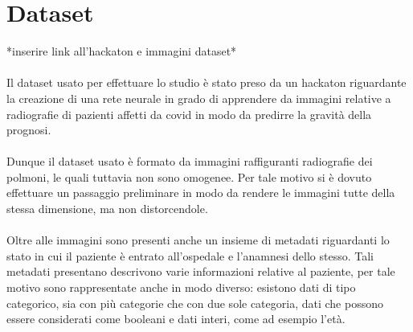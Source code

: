 \chapter{Dataset}
\label{ch:Dataset}

*inserire link all'hackaton e immagini dataset*
\\\\
Il dataset usato per effettuare lo studio è stato preso da un hackaton riguardante la creazione di una rete neurale in grado di apprendere 
da immagini relative a radiografie di pazienti affetti da covid in modo da predirre la gravità della prognosi.
\\\\
Dunque il dataset usato è formato da immagini raffiguranti radiografie dei polmoni, le quali tuttavia non sono omogenee. Per tale motivo 
si è dovuto effettuare un passaggio preliminare in modo da rendere le immagini tutte della stessa dimensione, ma non distorcendole.
\\\\
Oltre alle immagini sono presenti anche un insieme di metadati riguardanti lo stato in cui il paziente è entrato all'ospedale e l'anamnesi dello stesso.
Tali metadati presentano descrivono varie informazioni relative al paziente, per tale motivo sono rappresentate anche in modo diverso: esistono dati di tipo categorico, sia con più categorie che con
due sole categoria, dati che possono essere considerati come booleani e dati interi, come ad esempio l'età.
\\\\
